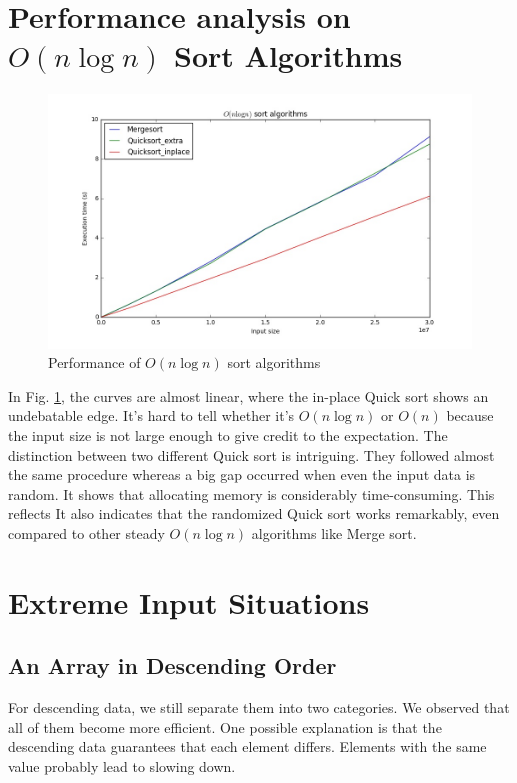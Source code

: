 \section{Performance analysis on $O(n\log n)$ Sort Algorithms}
\begin{figure}[H]
    \centering
    \includegraphics[width=0.8\linewidth]{../a1/345}
    \caption{Performance of $O(n\log n)$ sort algorithms}\label{345}
\end{figure}
In Fig. \ref{345}, the curves are almost linear, where the in-place Quick sort shows an undebatable edge. It's hard to tell whether it's $O(n\log n)$ or $O(n)$ because the input size is not large enough to give credit to the expectation. The distinction between two different Quick sort is intriguing. They followed almost the same procedure whereas a big gap occurred when even the input data is random. It shows that allocating memory is considerably time-consuming. This reflects It also indicates that the randomized Quick sort works remarkably, even compared to other steady $O(n\log n)$ algorithms like Merge sort.

\section{Extreme Input Situations}
\subsection{An Array in Descending Order}
For descending data, we still separate them into two categories. We observed that all of them become more efficient. One possible explanation is that the descending data guarantees that each element differs. Elements with the same value probably lead to slowing down.

